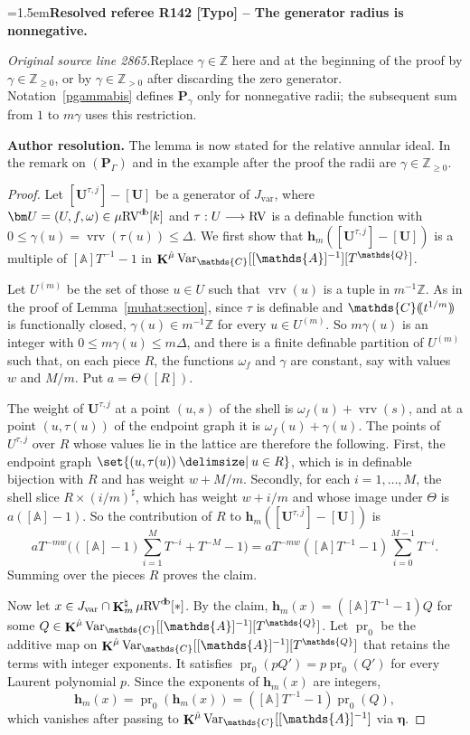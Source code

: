 \documentclass[12pt]{amsart}
\newcommand{\ResolvedRefereeRemark}[5]{%
  \par\medskip\begingroup\normalfont\small\color{gray}%
  \emergencystretch=1.5em\noindent\textbf{Resolved referee R#1 [#2] -- #3.}\par\nobreak\noindent #4\par
  \medskip\color{ResolutionGreen}\noindent\textbf{Author resolution.} #5\par
  \endgroup\medskip
}
\theoremstyle{plain}
\theoremstyle{definition}
\theoremstyle{remark}
\numberwithin{equation}{section}
\theoremstyle{plain}
\newcommand{\RV}{\textup{RV}}
\newcommand{\Z}{\mathds{Z}}
\newcommand{\A}{\mathds{A}}
\newcommand{\C}{\mathds{C}}
\newcommand{\Q}{\mathds{Q}}
\newcommand{\0}{\emptyset}
\newcommand{\dpar}[1]{%
   (\mkern-4mu (#1 )\mkern-4mu )}
\newcommand{\fun}{\longrightarrow}
\providecommand\given{}
\newcommand\SetSymbol[1][]{%
\nonscript \: #1 \vert
\allowbreak
\nonscript\:
\mathopen{}}
\renewcommand\given{\SetSymbol[\delimsize]}
\newcommand{\mgRV}{{\mu}{\RV}}
\DeclareMathOperator{\ggk}{\mathbf{K}}
\DeclareMathOperator{\vrv}{vrv}
\DeclareMathOperator{\db}{d \! b}
\newcommand{\var}{\textup{Var}}
\newcommand{\gmv}{\ggk^{\hat \mu}\var_{\C}}
\begin{document}
\ResolvedRefereeRemark{142}{Typo}{The generator radius is nonnegative}{%
\textit{Original source line 2865.}\quad Replace $\gamma\in\Z$ here and at the beginning of the proof by $\gamma\in\Z_{\geq0}$, or by $\gamma\in\Z_{>0}$ after discarding the zero generator. Notation~\ref{pgammabis} defines $\bm P_\gamma$ only for nonnegative radii; the subsequent sum from $1$ to $m\gamma$ uses this restriction.
}{The lemma is now stated for the relative annular ideal. In the remark on $(\bm P_\Gamma)$ and in the example after the proof the radii are $\gamma\in\Z_{\geq0}$.}

\begin{proof}
Let $[\bm U^{\tau, j}] - [\bm U]$ be a generator of $J_{\mathrm{var}}$, where $\bm U = (U, f, \omega) \in \mgRV^{\db}[k]$ and $\tau : U \fun \RV$ is a definable function with $0 \leq \gamma(u) = \vrv(\tau(u)) \leq \Delta$. We first show that $\bm h_m([\bm U^{\tau, j}] - [\bm U])$ is a multiple of $[\A] T^{-1} - 1$ in $\gmv[[\A]^{-1}][T^{\Q}]$.

Let $U^{(m)}$ be the set of those $u \in U$ such that $\vrv(u)$ is a tuple in $m^{-1}\Z$. As in the proof of Lemma~\ref{muhat:section}, since $\tau$ is definable and $\C \dpar{ t^{1/m} }$ is functionally closed, $\gamma(u) \in m^{-1}\Z$ for every $u \in U^{(m)}$. So $m \gamma(u)$ is an integer with $0 \leq m\gamma(u) \leq m \Delta$, and there is a finite definable partition of $U^{(m)}$ such that, on each piece $R$, the functions $\omega_f$ and $\gamma$ are constant, say with values $w$ and $M/m$. Put $a = \Theta([R])$.

The weight of $\bm U^{\tau, j}$ at a point $(u, s)$ of the shell is $\omega_f(u) + \vrv(s)$, and at a point $(u, \tau(u))$ of the endpoint graph it is $\omega_f(u) + \gamma(u)$. The points of $U^{\tau, j}$ over $R$ whose values lie in the lattice are therefore the following. First, the endpoint graph $\set{(u, \tau(u)) \given u \in R}$, which is in definable bijection with $R$ and has weight $w + M/m$. Secondly, for each $i = 1, \ldots, M$, the shell slice $R \times (i/m)^\sharp$, which has weight $w + i/m$ and whose image under $\Theta$ is $a([\A] - 1)$. So the contribution of $R$ to $\bm h_m([\bm U^{\tau, j}] - [\bm U])$ is
\[
a T^{-mw} \Big( ([\A] - 1) \sum_{i = 1}^{M} T^{-i} + T^{-M} - 1 \Big) = a T^{-mw} ([\A] T^{-1} - 1) \sum_{i = 0}^{M-1} T^{-i}.
\]
Summing over the pieces $R$ proves the claim.

Now let $x \in J_{\mathrm{var}} \cap \ggk^\natural_m \mgRV^{\db}[*]$. By the claim, $\bm h_m(x) = ([\A] T^{-1} - 1) Q$ for some $Q \in \gmv[[\A]^{-1}][T^{\Q}]$. Let $\operatorname{pr}_0$ be the additive map on $\gmv[[\A]^{-1}][T^{\Q}]$ that retains the terms with integer exponents. It satisfies $\operatorname{pr}_0(p Q') = p \operatorname{pr}_0(Q')$ for every Laurent polynomial $p$. Since the exponents of $\bm h_m(x)$ are integers,
\[
\bm h_m(x) = \operatorname{pr}_0(\bm h_m(x)) = ([\A] T^{-1} - 1) \operatorname{pr}_0(Q),
\]
which vanishes after passing to $\gmv[[\A]^{-1}]$ via $\bm \eta$.
\end{proof}
\end{document}
